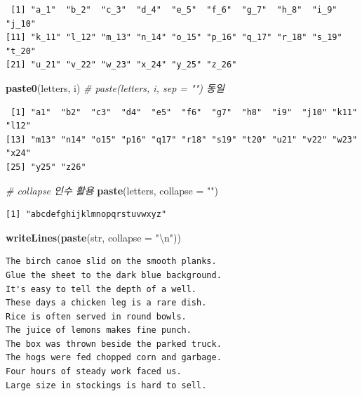 \documentclass[
  11pt,
]{krantz}
\newenvironment{Shaded}{\begin{snugshade}}{\end{snugshade}}
\newcommand{\CharTok}[1]{\textcolor[rgb]{0.5,0.5,0.5}{#1}}
\newcommand{\CommentTok}[1]{\textcolor[rgb]{0.37,0.37,0.37}{\textit{#1}}}
\newcommand{\DataTypeTok}[1]{\textcolor[rgb]{0.27,0.27,0.27}{#1}}
\newcommand{\KeywordTok}[1]{\textcolor[rgb]{0.27,0.27,0.27}{\textbf{#1}}}
\newcommand{\NormalTok}[1]{#1}
\newcommand{\StringTok}[1]{\textcolor[rgb]{0.5,0.5,0.5}{#1}}
\begin{document}
\begin{verbatim}
 [1] "a_1"  "b_2"  "c_3"  "d_4"  "e_5"  "f_6"  "g_7"  "h_8"  "i_9"  "j_10"
[11] "k_11" "l_12" "m_13" "n_14" "o_15" "p_16" "q_17" "r_18" "s_19" "t_20"
[21] "u_21" "v_22" "w_23" "x_24" "y_25" "z_26"
\end{verbatim}

\begin{Shaded}
\begin{Highlighting}[]
\KeywordTok{paste0}\NormalTok{(letters, i) }\CommentTok{# paste(letters, i, sep = "") 동일}
\end{Highlighting}
\end{Shaded}

\begin{verbatim}
 [1] "a1"  "b2"  "c3"  "d4"  "e5"  "f6"  "g7"  "h8"  "i9"  "j10" "k11" "l12"
[13] "m13" "n14" "o15" "p16" "q17" "r18" "s19" "t20" "u21" "v22" "w23" "x24"
[25] "y25" "z26"
\end{verbatim}

\begin{Shaded}
\begin{Highlighting}[]
\CommentTok{# collapse 인수 활용}
\KeywordTok{paste}\NormalTok{(letters, }\DataTypeTok{collapse =} \StringTok{""}\NormalTok{)}
\end{Highlighting}
\end{Shaded}

\begin{verbatim}
[1] "abcdefghijklmnopqrstuvwxyz"
\end{verbatim}

\begin{Shaded}
\begin{Highlighting}[]
\KeywordTok{writeLines}\NormalTok{(}\KeywordTok{paste}\NormalTok{(str, }\DataTypeTok{collapse =} \StringTok{"}\CharTok{\textbackslash{}n}\StringTok{"}\NormalTok{))}
\end{Highlighting}
\end{Shaded}

\begin{verbatim}
The birch canoe slid on the smooth planks.
Glue the sheet to the dark blue background.
It's easy to tell the depth of a well.
These days a chicken leg is a rare dish.
Rice is often served in round bowls.
The juice of lemons makes fine punch.
The box was thrown beside the parked truck.
The hogs were fed chopped corn and garbage.
Four hours of steady work faced us.
Large size in stockings is hard to sell.
\end{verbatim}
\end{document}
